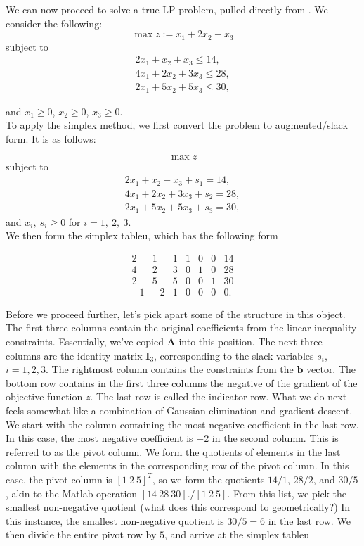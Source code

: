 \documentclass[12pt,english]{article}
\begin{document}
We can now proceed to solve a true LP problem, pulled directly from \cite{UWW}.  We consider the following:
$$
\max z := x_1 +2 x_2 - x_3
$$
subject to
$$
\begin{array}{c}
2 x_1 + x_2 + x_3 \leq 14, \\
4 x_1 + 2 x_2 + 3 x_3 \leq 28, \\
2 x_1 + 5 x_2 + 5 x_3 \leq 30,
\end{array}
$$

and $x_1 \geq 0$, $x_2 \geq 0$, $x_3 \geq 0$. \\

To apply the simplex method, we first convert the problem to augmented/slack form.  It is as follows:

$$
\max z
$$
subject to 
$$
\begin{array}{c}
2 x_1 + x_2 + x_3 + s_1 = 14, \\
4 x_1 + 2 x_2 + 3 x_3 + s_2 = 28, \\
2 x_1 + 5 x_2 + 5 x_3 + s_3 = 30,
\end{array}
$$
and $x_i, ~ s_i \geq 0$ for $i=1, ~2, ~3.$ \\

We then form the simplex tableu, which has the following form

\begin{equation}\label{eq:1.3}
\begin{array}{cccccc|c}
2 	&	1	& 	1 	& 	1	& 	0	&	0	&	14 \\
4	&	2	& 	3	&	0	&	1	&	0	&	28 \\
2	&	5	&	5	&	0	&	0	& 	1	& 	30 \\
\hline
-1	& 	-2	&	1	& 	0	&	0	&	0	&	0.
\end{array}
\end{equation}

Before we proceed further, let's pick apart some of the structure in this object.  The first three columns contain the original coefficients from the linear inequality constraints.  Essentially, we've copied $\mathbf{A}$ into this position.  The next three columns are the identity matrix $\mathbf{I}_3$, corresponding to the slack variables $s_i$, $i=1, 2, 3.$  The rightmost column contains the constraints from the $\mathbf{b}$ vector.  The bottom row contains in the first three columns the negative of the gradient of the objective function $z$.  The last row is called the indicator row.   What we do next feels somewhat like a combination of Gaussian elimination and gradient descent.  We start with the column containing the most negative coefficient in the last row.  In this case, the most negative coefficient is $-2$ in the second column.  This is referred to as the pivot column.   We form the quotients of elements in the last column with the elements in the corresponding row of the pivot column.  In this case, the pivot column is $[1 ~2 ~5]^T$, so we form the quotients $14/1$, $28/2$, and $30/5$, akin to the Matlab operation $[14 ~28 ~30]./[1 ~2 ~5]$.  From this list, we pick the smallest non-negative quotient (what does this correspond to geometrically?)  In this instance, the smallest non-negative quotient is $30/5 = 6$ in the last row.   We then divide the entire pivot row by $5$, and arrive at the simplex tableu
\end{document}
